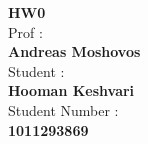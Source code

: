 \begin{center}
    \textbf{HW0}
    \\
    \vspace*{7mm}
    Prof :
    \\
    \vspace*{2mm}
    \textbf{\Large{Andreas Moshovos}}
    \\
    \vspace*{7mm}
    Student :
    \\
    \vspace*{2mm}
    \textbf{\Large{Hooman Keshvari}}
    \\
    \vspace*{7mm}
    Student Number :
    \\
    \vspace*{2mm}
    \textbf{\Large{1011293869}}
\end{center}